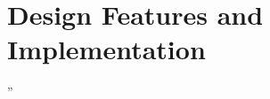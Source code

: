 \chapter{Design Features and Implementation} %
\label{chap:Chapter4}  %

\epigraph{” }{\textit{}}
 
